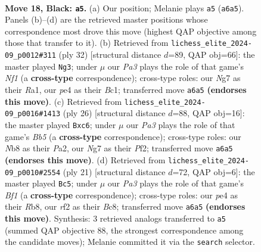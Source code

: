 \documentclass[11pt]{article}
\begin{document}
\begin{figure}[p]\centering
\begin{subfigure}{0.46\textwidth}\centering
\resizebox{\linewidth}{!}{%
\newchessgame
\chessboard[
  setfen={rn2bbr1/1p2k1np/p3p1p1/2P5/P1B1P3/2N5/1P3RPP/1RB1N1K1 b - - 0 18},
  showmover=false,
  pgfstyle=straightmove, color=movearrow, markmove={a6-a5}
]}
\caption{}
\end{subfigure}\hfill
\begin{subfigure}{0.46\textwidth}\centering
\resizebox{\linewidth}{!}{%
\newchessgame
\chessboard[
  setfen={1rb1r1k1/2p2pp1/p1n2n1p/2b1p3/P3P3/2P2N1P/5PP1/R1BBRNK1 w - - 1 17},
  showmover=false,
  pgfstyle=straightmove, color=movearrow, markmove={f1-g3}
]}
\caption{}
\end{subfigure}
\\[4pt]
\begin{subfigure}{0.46\textwidth}\centering
\resizebox{\linewidth}{!}{%
\newchessgame
\chessboard[
  setfen={r1br2k1/pp2ppbp/2n3p1/1B6/3PP3/4BN2/P2K1PPP/1R5R w - - 5 14},
  showmover=false,
  pgfstyle=straightmove, color=movearrow, markmove={b5-c6}
]}
\caption{}
\end{subfigure}\hfill
\begin{subfigure}{0.46\textwidth}\centering
\resizebox{\linewidth}{!}{%
\newchessgame
\chessboard[
  setfen={1rb1kb1r/p1pn1ppp/2B1p3/1p2P3/2p5/2N3P1/PP2PP1P/R1BR2K1 b k - 2 11},
  showmover=false,
  pgfstyle=straightmove, color=movearrow, markmove={f8-c5}
]}
\caption{}
\end{subfigure}
\caption{\textbf{Move 18, Black: \texttt{a5}.} (a) Our position; Melanie plays \texttt{a5} (\texttt{a6a5}). Panels (b)--(d) are the retrieved master positions whose correspondence most drove this move (highest QAP objective among those that transfer to it). (b) Retrieved from \texttt{lichess\_elite\_2024-09\_p0012\#311} (ply 32) [structural distance $d$=89, QAP obj=66]: the master played \texttt{Ng3}; under $\mu$ our \emph{Pa3} plays the role of that game's \emph{Nf1} (a \textbf{cross-type} correspondence); cross-type roles: our \emph{N}g7 as their \emph{R}a1, our \emph{p}e4 as their \emph{B}c1; transferred move \texttt{a6a5} \textbf{(endorses this move)}. (c) Retrieved from \texttt{lichess\_elite\_2024-09\_p0016\#1413} (ply 26) [structural distance $d$=88, QAP obj=16]: the master played \texttt{Bxc6}; under $\mu$ our \emph{Pa3} plays the role of that game's \emph{Bb5} (a \textbf{cross-type} correspondence); cross-type roles: our \emph{N}b8 as their \emph{P}a2, our \emph{N}g7 as their \emph{P}f2; transferred move \texttt{a6a5} \textbf{(endorses this move)}. (d) Retrieved from \texttt{lichess\_elite\_2024-09\_p0010\#2554} (ply 21) [structural distance $d$=72, QAP obj=6]: the master played \texttt{Bc5}; under $\mu$ our \emph{Pa3} plays the role of that game's \emph{Bf1} (a \textbf{cross-type} correspondence); cross-type roles: our \emph{p}e4 as their \emph{R}b8, our \emph{r}f2 as their \emph{B}c8; transferred move \texttt{a6a5} \textbf{(endorses this move)}. Synthesis: 3 retrieved analogs transferred to \texttt{a5} (summed QAP objective 88, the strongest correspondence among the candidate moves); Melanie committed it via the \texttt{search} selector.}
\label{fig:thought-m35}
\end{figure}
\end{document}
